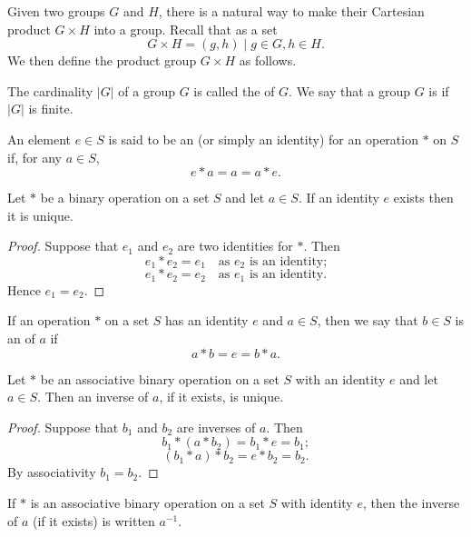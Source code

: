 Given two groups $G$ and $H$, there is a natural way to make their Cartesian product $G \times H$ into a group. Recall that as a set 
\[ G \times H = {(g,h)\mid g\in G, h\in H}. \]
We then define the product group $G\times H$ as follows.



\begin{definition}
The cardinality $|G|$ of a group $G$ is called the  of $G$. We say that a group $G$ is  if $|G|$ is finite.
\end{definition}



An element $e \in S$ is said to be an  (or simply an identity) for an operation $\ast$ on $S$ if, for any $a \in S$,
\[ e \ast a = a = a \ast e. \]

\begin{proposition}
Let $\ast$ be a binary operation on a set $S$ and let $a \in S$. If an identity $e$ exists then it is unique.
\end{proposition}
\begin{proof}
Suppose that $e_1$ and $e_2$ are two identities for $\ast$. Then
\[ e_1 \ast e_2 = e_1 \quad \text{as }e_2\text{ is an identity;} \]
\[ e_1 \ast e_2 = e_2 \quad \text{as }e_1\text{ is an identity.} \]
Hence $e_1 = e_2$.
\end{proof}

If an operation $\ast$ on a set $S$ has an identity $e$ and $a \in S$, then we say that $b \in S$ is an  of $a$ if
\[ a \ast b = e = b \ast a. \]

\begin{proposition}
Let $\ast$ be an associative binary operation on a set $S$ with an identity $e$ and let $a \in S$. Then an inverse of $a$, if it exists, is unique.
\end{proposition}
\begin{proof}
Suppose that $b_1$ and $b_2$ are inverses of $a$. Then
\[ b_1 \ast (a \ast b_2) = b_1 \ast e = b_1; \]
\[ (b_1 \ast a) \ast b_2 = e \ast b_2 = b_2. \]
By associativity $b_1 = b_2$.
\end{proof}

\begin{notation}
If $\ast$ is an associative binary operation on a set $S$ with identity $e$, then the inverse of $a$ (if it exists) is written $a^{-1}$.
\end{notation}

